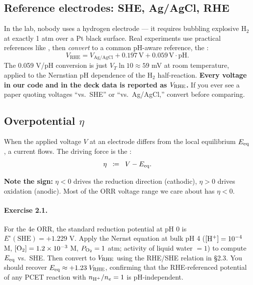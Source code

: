 \documentclass[11pt]{article}
\begin{document}
\subsection{Reference electrodes: SHE, Ag/AgCl, RHE}

In the lab, nobody uses a hydrogen electrode --- it requires
bubbling explosive H$_2$ at exactly 1 atm over a Pt black surface.
Real experiments use practical references like
, then \emph{convert} to a
common pH-aware reference, the :
\[
  V_{\mathrm{RHE}} = V_{\mathrm{Ag/AgCl}}
                   + 0.197\,\mathrm{V}
                   + 0.059\,\mathrm{V}\cdot \mathrm{pH}.
\]
The 0.059 V/pH conversion is just $V_T \ln 10 \approx 59$ mV at room
temperature, applied to the Nernstian pH dependence of the H$_2$
half-reaction. \textbf{Every voltage in our code and in the deck data
is reported as $V_{\mathrm{RHE}}$.} If you ever see a paper quoting voltages
``vs.\ SHE'' or ``vs.\ Ag/AgCl,'' convert before comparing.

\subsection{Overpotential $\eta$}

When the applied voltage $V$ at an electrode differs from the
local equilibrium $E_{\mathrm{eq}}$, a current flows. The driving force is the
:
\begin{equation}
  \eta \;\;\coloneqq\;\; V - E_{\mathrm{eq}}.
  \label{eq:overpotential}
\end{equation}

\textbf{Note the sign:} $\eta < 0$ drives the reduction direction
(cathodic), $\eta > 0$ drives oxidation (anodic). Most of the ORR
voltage range we care about has $\eta < 0$.

\paragraph{Exercise 2.1.}
For the 4e ORR, the standard reduction potential at pH 0 is
$E^{\circ}(\mathrm{SHE}) = +1.229$ V. Apply the Nernst equation at
bulk pH 4 ($[\mathrm{H^+}] = 10^{-4}$ M, $[\mathrm{O_2}] = 1.2 \times 10^{-3}$ M,
$P_{\mathrm{O_2}} = 1$ atm; activity of liquid water $= 1$) to compute
$E_{\mathrm{eq}}$ vs.\ SHE. Then convert to $V_{\mathrm{RHE}}$ using the RHE/SHE relation
in \S 2.3. You should recover $E_{\mathrm{eq}} \approx +1.23\;V_{\mathrm{RHE}}$,
confirming that the RHE-referenced potential of any PCET reaction
with $n_{\mathrm{H^+}}/n_e = 1$ is pH-independent.
\end{document}
